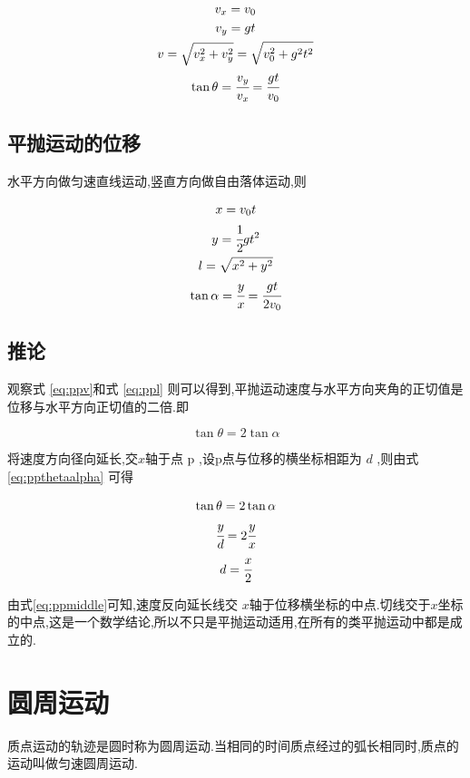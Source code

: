 \begin{gather}
  v_x=v_0 \\
  v_y=gt \\
  v=\sqrt{v_x^2+v_y^2}=\sqrt{v_0^2+g^2t^2} \\
  \tan\theta =\cfrac{v_y}{v_x}=\cfrac{gt}{v_0}
  \label{eq:ppv}
\end{gather}

\subsection{平抛运动的位移}

水平方向做匀速直线运动,竖直方向做自由落体运动,则

\begin{gather}
  x=v_0t\\
  y=\cfrac{1}{2}gt^2\\
  l=\sqrt{x^2+y^2}\\
  \tan \alpha =\cfrac{y}{x}=\cfrac{gt}{2v_0}
  \label{eq:ppl}
\end{gather}

\subsection{推论}

观察式 \eqref{eq:ppv}和式 \eqref{eq:ppl} 则可以得到,平抛运动速度与水平方向夹角的正切值是位移与水平方向正切值的二倍.即

\begin{equation}
  \tan\theta =2\tan \alpha
  \label{eq:ppthetaalpha}
\end{equation}

将速度方向径向延长,交$x$轴于点 p ,设p点与位移的横坐标相距为 $d$ ,则由式\eqref{eq:ppthetaalpha} 可得

\begin{gather}
  \tan\theta =2\tan \alpha \notag\\
  \cfrac{y}{d}=2\cfrac{y}{x} \notag\\
  d=\cfrac{x}{2}
  \label{eq:ppmiddle}
\end{gather}

由式\eqref{eq:ppmiddle}可知,速度反向延长线交 $x$轴于位移横坐标的中点.切线交于$x$坐标的中点,这是一个数学结论,所以不只是平抛运动适用,在所有的类平抛运动中都是成立的.

\section{圆周运动}
质点运动的轨迹是圆时称为圆周运动.当相同的时间质点经过的弧长相同时,质点的运动叫做匀速圆周运动.
